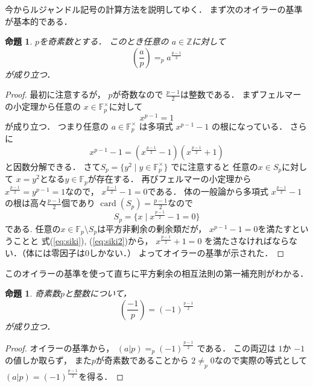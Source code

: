 \documentclass[leqno, 12pt]{jsarticle}
\newtheorem{prop}[thm]{命題}
\newcommand{\zz}{\mathbb{Z}}
\newcommand{\ff}{\mathbb{F}}
\newcommand{\leg}[2]{\left(\frac{#1}{#2}\right)}
\DeclareMathOperator{\card}{card}
\begin{document}
今からルジャンドル記号の計算方法を説明してゆく．
まず次のオイラーの基準が基本的である．
\begin{prop}
$p$を奇素数とする．
このとき任意の
$a\in \zz$に対して
\[
\leg{a}{p}=_p a^{\frac{p-1}{2}}
\]
が成り立つ．
\end{prop}
\begin{proof}
最初に注意するが，
$p$が奇数なので
$\frac{p-1}{2}$は整数である．
まずフェルマーの小定理から任意の
$x\in \ff_{p}^{\times}$に対して
\[
x^{p-1}=1
\]
が成り立つ．
つまり任意の
$a\in \ff_p^{\times}$
は多項式
$x^{p-1}-1$
の根になっている．
さらに
\begin{equation}\label{eq:siki}
x^{p-1}-1=\left(x^{\frac{p-1}{2}}-1\right)\left(x^{\frac{p-1}{2}}+1\right)
\end{equation}
と因数分解できる．
さて$S_p=\{y^2\mid y\in \ff_p^{\times}\}$
でに注意すると
任意の$x\in S_p$に対して
$x=y^2$となる$y\in \ff_p$が存在する．
再びフェルマーの小定理から
$x^{\frac{p-1}{2}}=y^{p-1}=1$なので，
$x^{\frac{p-1}{2}}-1=0$である．
体の一般論から多項式
$x^{\frac{p-1}{2}}-1$の根は高々$\frac{p-1}{2}$個であり
$\card(S_p)=\frac{p-1}{2}$なので
\begin{equation}\label{eq:siki2}
S_p=\{x\mid x^{\frac{p-1}{2}}-1=0\}
\end{equation}
である.
任意の$x\in \ff_p\setminus S_p$は平方非剰余の剰余類だが，
$x^{p-1}-1=0$を満たすということと
式(\ref{eq:siki}), (\ref{eq:siki2})から，
$x^{\frac{p-1}{2}}+1=0$
を満たさなければならない．（体には零因子は$0$しかない．）
よってオイラーの基準が示された．
\end{proof}


このオイラーの基準を使って直ちに平方剰余の相互法則の第一補充則がわかる．
\begin{prop}
奇素数$p$と整数について，
\[
\leg{-1}{p}=(-1)^{\frac{p-1}{2}}
\]
が成り立つ．
\end{prop}
\begin{proof}
オイラーの基準から，
$(a|p)=_p(-1)^{\frac{p-1}{2}}$
である．
この両辺は
$1$か
$-1$の値しか取らず，
また$p$が奇素数であることから
$2\neq_p0$なので実際の等式として
$(a|p)=(-1)^{\frac{p-1}{2}}$を得る．
\end{proof}
\end{document}
